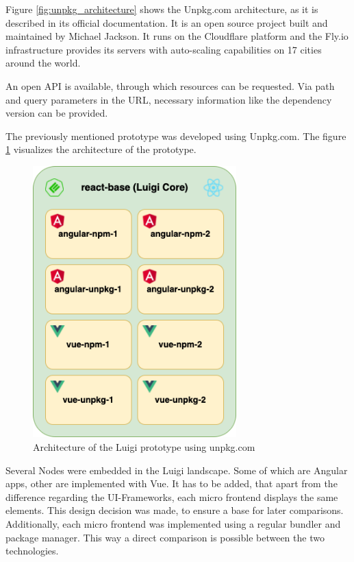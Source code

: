 Figure \ref{fig:unpkg_architecture} shows the Unpkg.com architecture, as it is described in its official documentation. It is an open source project built and maintained by Michael Jackson. It runs on the Cloudflare platform and the Fly.io infrastructure provides its servers with auto-scaling capabilities on 17 cities around the world.\cite{unpkg_doc}

An open API is available, through which resources can be requested. Via path and query parameters in the URL, necessary information like the dependency version can be provided.

The previously mentioned prototype was developed using Unpkg.com. The figure \ref{fig:unpkg_prototype_architecture} visualizes the architecture of the prototype.

\begin{figure}[!h]
	\centering
	\includegraphics[width=0.7\textwidth]{Figures/unpkg.architecture.drawio.png}
	\caption{Architecture of the Luigi prototype using unpkg.com}
	\label{fig:unpkg_prototype_architecture}
\end{figure}
\newpage
Several Nodes were embedded in the Luigi landscape. Some of which are Angular apps, other are implemented with Vue. It has to be added, that apart from the difference regarding the UI-Frameworks, each micro frontend displays the same elements. This design decision was made, to ensure a base for later comparisons. Additionally, each micro frontend was implemented using a regular bundler and package manager. This way a direct comparison is possible between the two technologies.

